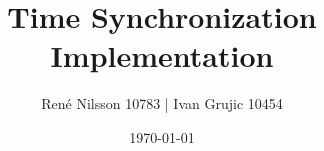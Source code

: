 \documentclass[10pt]{article}
\title{Time Synchronization Implementation}
\author{René Nilsson 10783 | Ivan Grujic 10454}
\date{\today}
\begin{document}
\maketitle



\listoffixmes
\newpage

\tableofcontents

\newpage



\newpage



\newpage






\newpage



\newpage






\newpage

\end{document}
